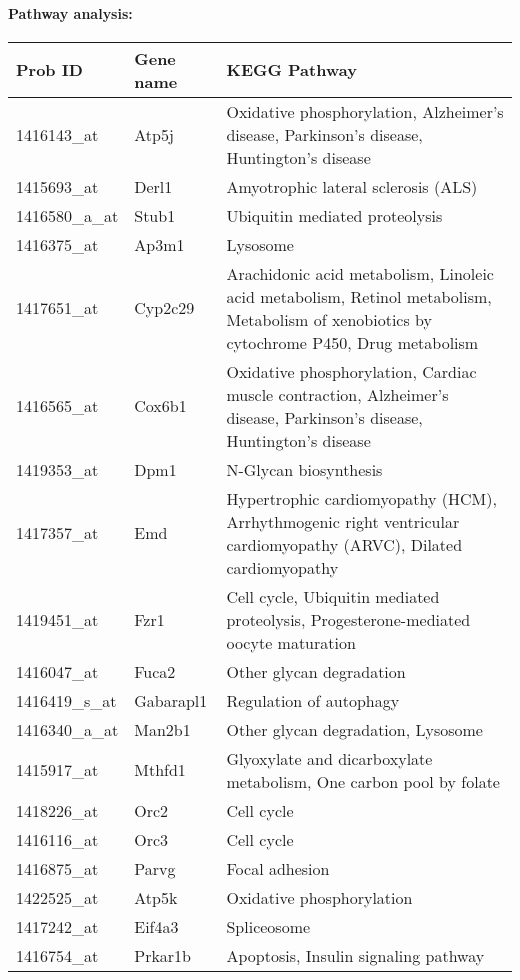 \paragraph{Pathway analysis:}
\begin{table}
    \begin{tabularx}{0.99\textwidth}{ l l X }
    \toprule
	Prob ID & Gene name	& KEGG Pathway \\
    \midrule
	1416143_at &	Atp5j 	& Oxidative phosphorylation, Alzheimer's disease, Parkinson's disease, Huntington's disease\\
	1415693_at &	Derl1 	& Amyotrophic lateral sclerosis (ALS)\\
	1416580_a_at &	Stub1	& Ubiquitin mediated proteolysis\\
	1416375_at &	Ap3m1	& Lysosome\\
	1417651_at &	Cyp2c29	& Arachidonic acid metabolism, Linoleic acid metabolism, Retinol metabolism, Metabolism of xenobiotics by cytochrome P450, Drug metabolism\\
	1416565_at &	Cox6b1	& Oxidative phosphorylation, Cardiac muscle contraction, Alzheimer's disease, Parkinson's disease, Huntington's disease\\
	1419353_at &	Dpm1	& N-Glycan biosynthesis\\
	1417357_at &	Emd	& Hypertrophic cardiomyopathy (HCM), Arrhythmogenic right ventricular cardiomyopathy (ARVC), Dilated cardiomyopathy\\
	1419451_at &	Fzr1	& Cell cycle, Ubiquitin mediated proteolysis, Progesterone-mediated oocyte maturation\\
	1416047_at &	Fuca2	& Other glycan degradation\\
	1416419_s_at &	Gabarapl1	& Regulation of autophagy\\
	1416340_a_at &	Man2b1	& Other glycan degradation, Lysosome\\
	1415917_at &	Mthfd1	& Glyoxylate and dicarboxylate metabolism, One carbon pool by folate\\
	1418226_at &	Orc2	& Cell cycle\\
	1416116_at &	Orc3	& Cell cycle\\
	1416875_at &	Parvg	& Focal adhesion\\
	1422525_at &	Atp5k	& Oxidative phosphorylation\\
	1417242_at &	Eif4a3	& Spliceosome\\
	1416754_at &	Prkar1b	& Apoptosis, Insulin signaling pathway\\

\end{tabularx}
\end{table}
